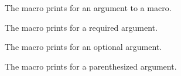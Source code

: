 The macro  prints  for an argument to a macro.

The macro  prints  for a required argument.

The macro  prints  for an optional argument.

The macro  prints  for a parenthesized argument.



